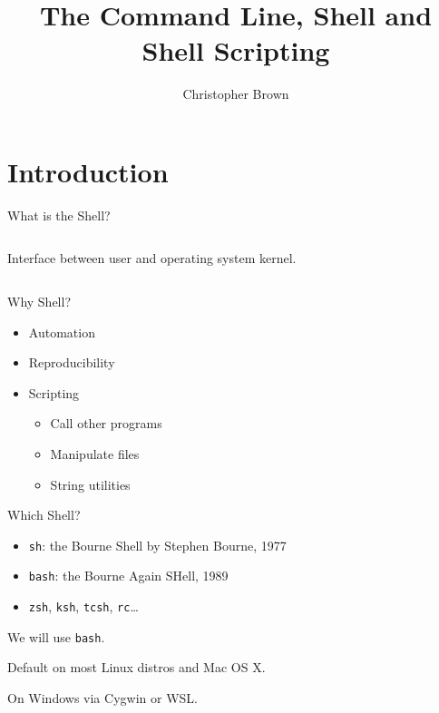 \documentclass[pdf,usenames,dvipsnames,14pt]{beamer}%
\title[Command Line \& Shell]{The Command Line, Shell and Shell Scripting}
\author{Christopher Brown}
\date{}
\begin{document}
\lstset{aboveskip=0pt, belowskip=0pt} %

\begin{frame}
	\titlepage
\end{frame}

\section{Introduction}

\begin{frame}{What is the Shell?}
	\begin{columns}[t]
		Interface between user and operating system kernel.
	\end{columns}
\end{frame}

\begin{frame}{Why Shell?}
	\begin{itemize}
		\item Automation
		\item Reproducibility
		\item Scripting
		\begin{itemize}
			\item Call other programs
			\item Manipulate files
			\item String utilities
		\end{itemize}
	\end{itemize}
\end{frame}

\begin{frame}{Which Shell?}
	\begin{itemize}
		\item \texttt{sh}: the Bourne Shell by Stephen Bourne, 1977
		\item \texttt{bash}: the Bourne Again SHell, 1989
		\item \texttt{zsh}, \texttt{ksh}, \texttt{tcsh}, \texttt{rc}\dots
	\end{itemize}
	We will use \texttt{bash}.
	
	Default on most Linux distros and Mac OS X.
	
	On Windows via Cygwin or WSL.
\end{frame}
\end{document}
